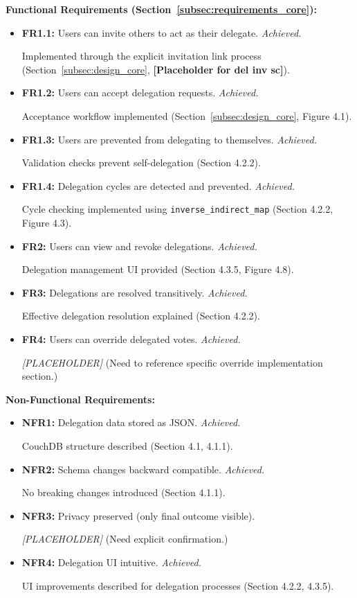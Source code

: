 \textbf{Functional Requirements (Section~\ref{subsec:requirements_core}):}
\begin{itemize}
    \item \textbf{FR1.1:} Users can invite others to act as their delegate. \textit{Achieved.}
    
    Implemented through the explicit invitation link process (Section~\ref{subsec:design_core}, \textbf{[Placeholder for del inv sc]}).
    \item \textbf{FR1.2:} Users can accept delegation requests. \textit{Achieved.} 
    
    Acceptance workflow implemented (Section~\ref{subsec:design_core}, Figure 4.1).
    \item \textbf{FR1.3:} Users are prevented from delegating to themselves. \textit{Achieved.}
    
    Validation checks prevent self-delegation (Section 4.2.2).
    \item \textbf{FR1.4:} Delegation cycles are detected and prevented. \textit{Achieved.} 
    
    Cycle checking implemented using \texttt{inverse\_indirect\_map} (Section 4.2.2, Figure 4.3).
    \item \textbf{FR2:} Users can view and revoke delegations. \textit{Achieved.} 
    
    Delegation management UI provided (Section 4.3.5, Figure 4.8).
    \item \textbf{FR3:} Delegations are resolved transitively. \textit{Achieved.} 
    
    Effective delegation resolution explained (Section 4.2.2).
    \item \textbf{FR4:} Users can override delegated votes. \textit{Achieved.}
    
    \textit{[PLACEHOLDER]} (Need to reference specific override implementation section.)
\end{itemize}

\textbf{Non-Functional Requirements:}
\begin{itemize}
    \item \textbf{NFR1:} Delegation data stored as JSON. \textit{Achieved.}
    
    CouchDB structure described (Section 4.1, 4.1.1).
    \item \textbf{NFR2:} Schema changes backward compatible. \textit{Achieved.}
    
    No breaking changes introduced (Section 4.1.1).
    \item \textbf{NFR3:} Privacy preserved (only final outcome visible).
    
    \textit{[PLACEHOLDER]} (Need explicit confirmation.)
    \item \textbf{NFR4:} Delegation UI intuitive. \textit{Achieved.}
    
    UI improvements described for delegation processes (Section 4.2.2, 4.3.5).
\end{itemize}

